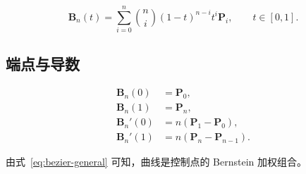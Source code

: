 \documentclass[UTF8]{ctexart}
\begin{document}
\begin{equation}
\boxed{
\bm B_n(t)
=
\sum_{i=0}^{n}
\binom{n}{i}
(1-t)^{n-i}t^i\bm P_i
},
\qquad t\in[0,1].
\label{eq:bezier-general}
\end{equation}

\subsection{端点与导数}

\begin{align}
\bm B_n(0)&=\bm P_0,\\
\bm B_n(1)&=\bm P_n,\\
\bm B_n'(0)&=n(\bm P_1-\bm P_0),\\
\bm B_n'(1)&=n(\bm P_n-\bm P_{n-1}).
\end{align}

由式~\eqref{eq:bezier-general} 可知，曲线是控制点的 Bernstein 加权组合。
\end{document}
